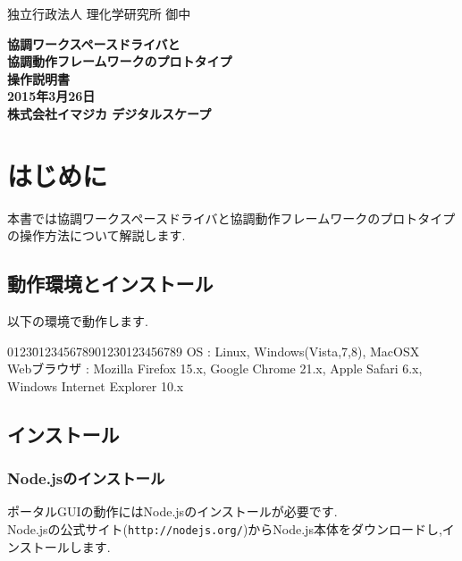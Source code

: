 \documentclass[a4paper,10pt,oneside]{jsbook}
\begin{document}
\begin{titlepage}
\noindent
独立行政法人 理化学研究所 御中
\begin{center}
	\vspace{8cm}
	{\Huge \textbf{協調ワークスペースドライバと}} \\
	\vspace{1cm}
	{\Huge \textbf{協調動作フレームワークのプロトタイプ}} \\
	\vspace{1cm}
	{\Huge \textbf{操作説明書}} \\
	\vspace{10cm}
	{\Large \textbf{2015年3月26日}} \\
	\vspace{0.5cm}
	{\Large \textbf{株式会社イマジカ デジタルスケープ}}
\end{center}
\end{titlepage}



\tableofcontents

\chapter{はじめに}
本書では協調ワークスペースドライバと協調動作フレームワークのプロトタイプの操作方法について解説します.\\

\section{動作環境とインストール}
以下の環境で動作します.

\begin{tabbing}
0123\=01234567890123\=0123456789\kill
\> OS \> : Linux, Windows(Vista,7,8), MacOSX \\
\> Webブラウザ \> : Mozilla Firefox 15.x, Google Chrome 21.x, Apple Safari 6.x, Windows Internet Explorer 10.x 
\end{tabbing}

\section{インストール}

\subsection{Node.jsのインストール}
ポータルGUIの動作にはNode.jsのインストールが必要です.\\
Node.jsの公式サイト(\verb+http://nodejs.org/+)からNode.js本体をダウンロードし,インストールします.
\end{document}
